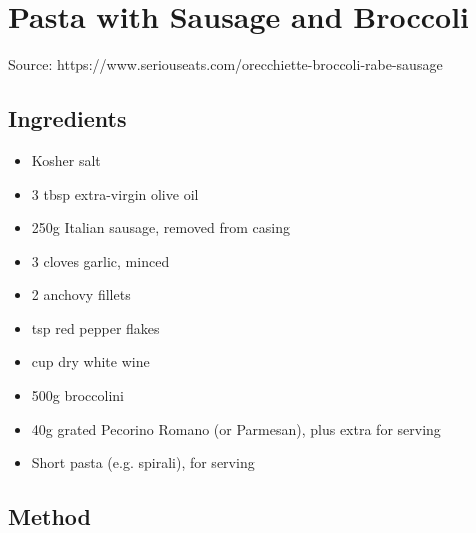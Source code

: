 \clearpage
\section{Pasta with Sausage and Broccoli}

  
Source: https://www.seriouseats.com/orecchiette-broccoli-rabe-sausage
  
\subsection{Ingredients}
  
\begin{itemize}
  \item Kosher salt
  \item 3 tbsp extra-virgin olive oil
  \item 250g Italian sausage, removed from casing
  \item 3 cloves garlic, minced
  \item 2 anchovy fillets
  \item {} tsp red pepper flakes
  \item {} cup dry white wine
  \item 500g broccolini
  \item 40g grated Pecorino Romano (or Parmesan), plus extra for serving
  \item Short pasta (e.g. spirali), for serving
\end{itemize}

\subsection{Method}

